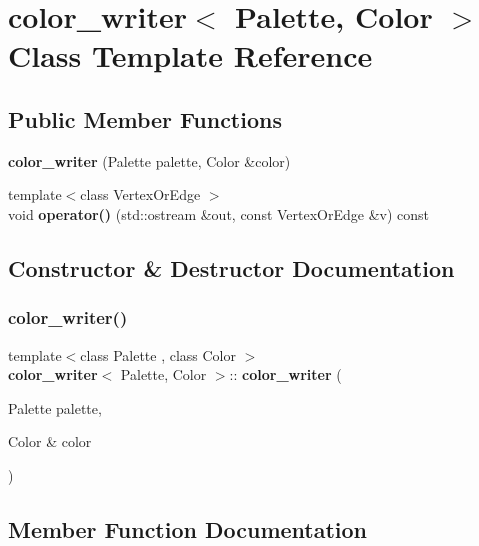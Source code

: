 \section{color\+\_\+writer$<$ Palette, Color $>$ Class Template Reference}
\label{classcolor__writer}
\subsection*{Public Member Functions}
\begin{DoxyCompactItemize}
\item 
\textbf{ color\+\_\+writer} (Palette palette, Color \&color)
\item 
{\footnotesize template$<$class Vertex\+Or\+Edge $>$ }\\void \textbf{ operator()} (std\+::ostream \&out, const Vertex\+Or\+Edge \&v) const
\end{DoxyCompactItemize}


\subsection{Constructor \& Destructor Documentation}
\mbox{\label{classcolor__writer_a01986d9b2a5e01e9ab7a00a015ab143e}} 
\subsubsection{color\+\_\+writer()}
{\footnotesize\ttfamily template$<$class Palette , class Color $>$ \\
\textbf{ color\+\_\+writer}$<$ Palette, Color $>$\+::\textbf{ color\+\_\+writer} (\begin{DoxyParamCaption}\item[{Palette}]{palette,  }\item[{Color \&}]{color }\end{DoxyParamCaption})\hspace{0.3cm}{\ttfamily [inline]}}



\subsection{Member Function Documentation}
\mbox{\label{classcolor__writer_a636afacb83e8fc901d94aed9bd1c0117}} 
